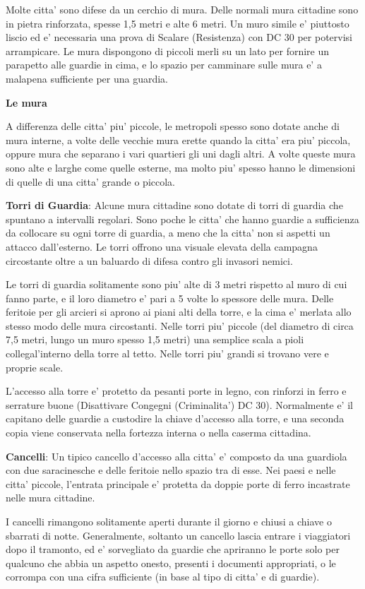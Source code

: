 \documentclass[a4paper,11pt,twoside,openany]{book}
\begin{document}
Molte citta' sono difese da un cerchio di mura. Delle normali mura cittadine sono in pietra rinforzata, spesse 1,5 metri e alte 6 metri. Un muro simile e' piuttosto liscio ed e' necessaria una prova di Scalare (Resistenza) con DC 30 per potervisi arrampicare. Le mura dispongono di piccoli merli su un lato per fornire un parapetto alle guardie in cima, e lo spazio per camminare sulle mura e' a malapena sufficiente per una guardia.

\textbf{Le mura}

A differenza delle citta' piu' piccole, le metropoli spesso sono dotate anche di mura interne, a volte delle vecchie mura erette quando la citta' era piu' piccola, oppure mura che separano i vari quartieri gli uni dagli altri. A volte queste mura sono alte e larghe come quelle esterne, ma molto piu' spesso hanno le dimensioni di quelle di una citta' grande o piccola.

\textbf{Torri di Guardia}: Alcune mura cittadine sono dotate di torri di guardia che spuntano a intervalli regolari. Sono poche le citta' che hanno guardie a sufficienza da collocare su ogni torre di guardia, a meno che la citta' non si aspetti un attacco dall'esterno. Le torri offrono una visuale elevata della campagna circostante oltre a un baluardo di difesa contro gli invasori nemici.

Le torri di guardia solitamente sono piu' alte di 3 metri rispetto al muro di cui fanno parte, e il loro diametro e' pari a 5 volte lo spessore delle mura. Delle feritoie per gli arcieri si aprono ai piani alti della torre, e la cima e' merlata allo stesso modo delle mura circostanti. Nelle torri piu' piccole (del diametro di circa 7,5 metri, lungo un muro spesso 1,5 metri) una semplice scala a pioli collegal'interno della torre al tetto. Nelle torri piu' grandi si trovano vere e proprie scale.

L'accesso alla torre e' protetto da pesanti porte in legno, con rinforzi in ferro e serrature buone (Disattivare Congegni (Criminalita') DC 30). Normalmente e' il capitano delle guardie a custodire la chiave d'accesso alla torre, e una seconda copia viene conservata nella fortezza interna o nella caserma cittadina.

\textbf{Cancelli}: Un tipico cancello d'accesso alla citta' e' composto da una guardiola con due saracinesche e delle feritoie nello spazio tra di esse. Nei paesi e nelle citta' piccole, l'entrata principale e' protetta da doppie porte di ferro incastrate nelle mura cittadine.

I cancelli rimangono solitamente aperti durante il giorno e chiusi a chiave o sbarrati di notte. Generalmente, soltanto un cancello lascia entrare i viaggiatori dopo il tramonto, ed e' sorvegliato da guardie che apriranno le porte solo per qualcuno che abbia un aspetto onesto, presenti i documenti appropriati, o le corrompa con una cifra sufficiente (in base al tipo di citta' e di guardie).
\end{document}
